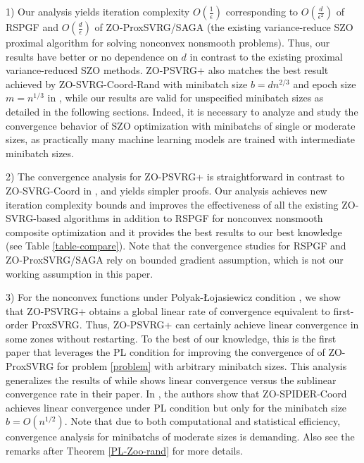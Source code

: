 1) Our analysis yields iteration complexity $O(\frac{1}{{\epsilon}})$ corresponding to $O(\frac{d}{\epsilon^2})$ of RSPGF \cite{ghadimi2016accelerated}  and $O(\frac{d}{\epsilon})$ of ZO-ProxSVRG/SAGA  \cite{huang2019faster} (the existing variance-reduce SZO proximal algorithm for solving nonconvex nonsmooth problems).  
Thus, our results have better or no dependence on
$d$ in contrast to the existing proximal variance-reduced SZO methods. ZO-PSVRG+ also matches the best result achieved by ZO-SVRG-Coord-Rand with minibatch size $b = d n^{2/3}$ and epoch size $m = n^{1/3}$ in \cite{ji2019improved}, while our results are valid for unspecified minibatch sizes as detailed in the following sections.  
Indeed, it is necessary to analyze and study the convergence behavior of SZO optimization with minibatchs of single or moderate sizes, as practically many machine learning models are trained with intermediate minibatch sizes.


2) The convergence analysis for ZO-PSVRG+ is straightforward in contrast to  ZO-SVRG-Coord in \cite{liu2018zeroth,ji2019improved}, and yields simpler proofs. Our analysis achieves new iteration complexity bounds and improves the effectiveness of  all the existing ZO-SVRG-based algorithms in addition to RSPGF for nonconvex nonsmooth composite optimization and it provides the best results to our best knowledge (see Table \ref{table-compare}). Note that the convergence studies for RSPGF and ZO-ProxSVRG/SAGA rely on bounded gradient assumption, which is not our working assumption in this paper.


3) For the nonconvex functions under Polyak-Łojasiewicz condition \cite{polyak1963gradient}, we show that ZO-PSVRG+
obtains a global linear rate of convergence  equivalent to first-order ProxSVRG. Thus, ZO-PSVRG+ can certainly achieve linear convergence in some zones without restarting. To the best of
our knowledge, this is the first paper that leverages the PL condition for improving the convergence of of ZO-ProxSVRG for problem \eqref{problem} with arbitrary minibatch sizes. This analysis generalizes the results of \cite{duchi2015optimal} while  shows linear convergence versus the sublinear convergence rate in their paper.
In \cite{ji2019improved}, the authors show that  ZO-SPIDER-Coord achieves linear convergence under PL condition but only for the minibatch size $b = O(n^{1/2})$.  Note that due to both computational and statistical efficiency, convergence analysis for minibatchs of moderate sizes is demanding. Also see the remarks after Theorem \ref{PL-Zoo-rand} for more details. 

